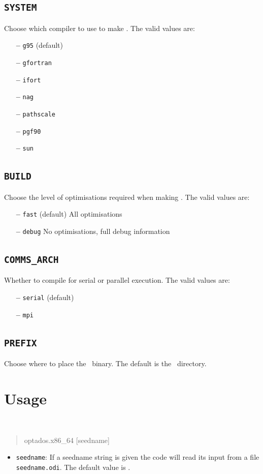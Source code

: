 \documentclass[a4paper,11pt,twoside]{book}
\begin{document}
{\subsection[system]{\tt SYSTEM}

Choose which compiler to use to make \optados. The valid values are:
\begin{itemize}
\item[{\bf --}]  \verb#g95# (default)
\item[{\bf --}]  \verb#gfortran#
\item[{\bf --}]  \verb#ifort#
\item[{\bf --}]  \verb#nag#
\item[{\bf --}]  \verb#pathscale#
\item[{\bf --}]  \verb#pgf90#
\item[{\bf --}]  \verb#sun#
\end{itemize}

\subsection[build]{\tt BUILD}

Choose the level of optimisations required when making \optados.  The valid values are:
\begin{itemize}
\item[{\bf --}]  \verb#fast# (default) All optimisations
\item[{\bf --}]  \verb#debug# No optimisations, full debug information
\end{itemize}

\subsection[comms_arch]{\tt COMMS\_ARCH}

Whether to compile for serial or parallel execution. The valid values are:
\begin{itemize}
\item[{\bf --}]  \verb#serial# (default) 
\item[{\bf --}]  \verb#mpi# 
\end{itemize}

\subsection[bin_dir]{\tt PREFIX}
Choose where to place the \optados\ binary. The default is the \optados\ directory.


\section{Usage}
{\tt
\begin{quote}
optados.x86\_64  [seedname]
\end{quote} }
\begin{itemize}
\item{  {\tt seedname}: If a seedname string is given the code will read its input from a file {\tt seedname.odi}. The default value is \castep.}
\end{itemize}


}
\end{document}
